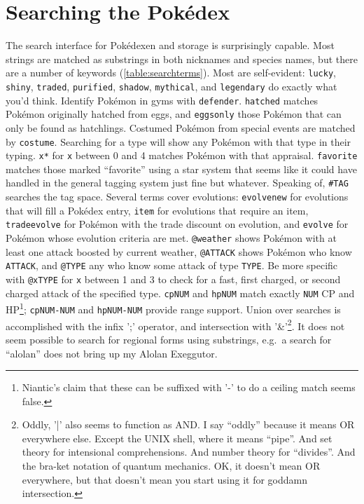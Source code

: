 \section{Searching the Pokédex}
\label{sec:searching}
The search interface for Pokédexen and storage is surprisingly capable.
Most strings are matched as substrings in both nicknames and species names,
 but there are a number of keywords (\autoref{table:searchterms}).
Most are self-evident: \texttt{lucky}, \texttt{shiny}, \texttt{traded}, \texttt{purified},
  \texttt{shadow}, \texttt{mythical}, and \texttt{legendary} do exactly
  what you'd think.
Identify Pokémon in gyms with \texttt{defender}.
\texttt{hatched} matches Pokémon originally hatched from eggs,
 and \texttt{eggsonly} those Pokémon that can only be found
 as hatchlings.
Costumed Pokémon from special events are matched by \texttt{costume}.
Searching for a type will show any Pokémon with that type in their typing.
\texttt{x*} for \texttt{x} between 0 and 4 matches Pokémon with that appraisal.
\texttt{favorite} matches those marked ``favorite'' using a star system that
 seems like it could have handled in the general tagging system just fine
 but whatever.
Speaking of, \texttt{\#TAG} searches the tag space.
Several terms cover evolutions: \texttt{evolvenew} for evolutions that will
  fill a Pokédex entry, \texttt{item} for evolutions that require an item,
  \texttt{tradeevolve} for Pokémon with the trade discount on evolution,
  and \texttt{evolve} for Pokémon whose evolution criteria are met.
\texttt{@weather} shows Pokémon with at least one attack boosted by current
 weather, \texttt{@ATTACK} shows Pokémon who know \texttt{ATTACK}, and \texttt{@TYPE}
 any who know some attack of type \texttt{TYPE}.
Be more specific with \texttt{@xTYPE} for \texttt{x} between 1 and 3 to check
  for a fast, first charged, or second charged attack of the specified type.
\texttt{cpNUM} and \texttt{hpNUM} match exactly \texttt{NUM} CP and HP\footnote{Niantic's claim
  that these can be suffixed with '-' to do a ceiling match seems false.};
  \texttt{cpNUM-NUM} and \texttt{hpNUM-NUM} provide range support.
Union over searches is accomplished with the infix ';' operator,
  and intersection with '\&'\footnote{Oddly, '|' also seems to function as AND. I say ``oddly'' because it means OR everywhere else.
  Except the UNIX shell, where it means ``pipe''.
  And set theory for intensional comprehensions.
  And number theory for ``divides''.
  And the bra-ket notation of quantum mechanics.
  OK, it doesn't mean OR everywhere, but that doesn't mean you start using it for goddamn intersection.}.
It does not seem possible to search for regional forms using substrings,
 e.g.\ a search for ``alolan'' does not bring up my Alolan Exeggutor.
